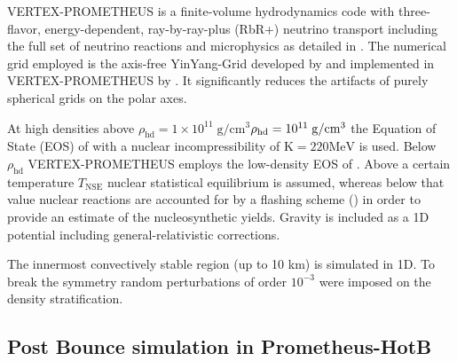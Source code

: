 \documentclass[fleqn,usenatbib]{mnras}
\newcommand{\vertexprom}{\textsc{V{\footnotesize ERTEX}-P{\footnotesize ROMETHEUS}}\xspace}
\newcommand{\NY}[2]{{\color{blue}\sout{#1}#2}}
\begin{document}
\vertexprom  is a finite-volume hydrodynamics code with three-flavor, energy-dependent, ray-by-ray-plus (RbR+) neutrino transport including the full set of neutrino reactions and microphysics as detailed in \cite{Rampp2002}.  The numerical grid employed is the axis-free YinYang-Grid developed by \cite{Kageyama2004} and implemented in \vertexprom by \cite{Melson2015}. It significantly reduces the artifacts of purely spherical grids on the polar axes. 

At high densities above \NY{$\rho_{\mathrm{hd}}=1\times10^{11}\;\mathrm{g/cm^3}$}{$\rho_{\rm{hd}}=10^{11}\;\mathrm{g/cm^3}$} the  Equation of State (EOS) of \cite{Lattimer1991} with a nuclear incompressibility of $\mathrm{K}=220\mathrm{MeV}$ is used. Below $\rho_{\mathrm{hd}}$ \vertexprom employs the low-density EOS of \cite{Janka1999Unpublished}. Above a certain temperature $T_{\mathrm{NSE}}$ nuclear statistical equilibrium is assumed, whereas below that value nuclear reactions are accounted for by a flashing scheme (\cite{Ramppa}) in order to provide an estimate of the nucleosynthetic yields.
Gravity is included as a 1D potential including general-relativistic corrections.

The innermost convectively stable region (up to 10 km) is simulated in 1D. To break the symmetry random perturbations of order $10^{-3}$ were imposed on the density stratification.

\subsection{Post Bounce simulation in Prometheus-HotB}
\end{document}

